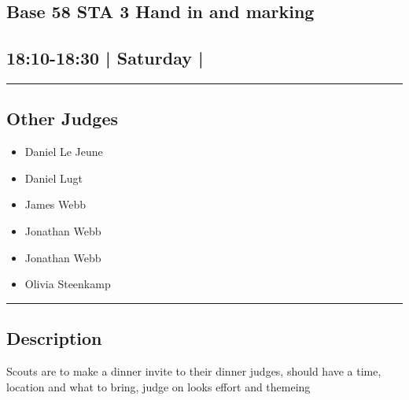 \documentclass[10pt, A5]{article}
\begin{document}
	

		\begin{framed}
			\begin{minipage}{\textwidth}

			\setcounter{section}{66}
							\section{\faStar \: Base 58 \faStar \: STA 3 Hand in and marking}
						
			\subsection*{18:10-18:30 | Saturday | }

			\vspace{0.25cm}
			\hrule
			\vspace{0.25cm}


			\subsection*{Other Judges}
							

				\begin{multicols}{2}

			\begin{itemize}
											\item Daniel Le Jeune
											\item Daniel Lugt
											\item James Webb
											\item Jonathan Webb
								\end{itemize}

			\vfill\null
			\columnbreak

			\begin{itemize}
											\item Jonathan Webb
											\item Olivia Steenkamp
								\end{itemize}

			\vfill\null

			\end{multicols}

			\vspace{0.25cm}
			\hrule
			\vspace{0.25cm}

			\begin{minipage}{\textwidth}
			\subsection*{\faListAlt \: Description}
			Scouts are to make a dinner invite to their dinner judges, should have a time, location and what to bring, judge on looks effort and themeing
			\end{minipage}


	\end{minipage}
	\end{framed}
\end{document}
